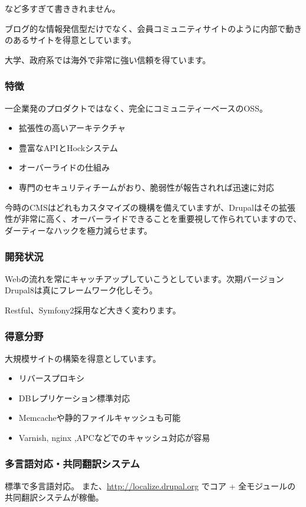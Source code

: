 \documentclass[mingoth,a4paper]{jsarticle}
\begin{document}
など多すぎて書ききれません。

ブログ的な情報発信型だけでなく、会員コミュニティサイトのように内部で動きのあるサイトを得意としています。

大学、政府系では海外で非常に強い信頼を得ています。

\subsubsection{特徴}
一企業発のプロダクトではなく、完全にコミュニティーベースのOSS。

\begin{itemize}
\item 拡張性の高いアーキテクチャ
\item 豊富なAPIとHockシステム
\item オーバーライドの仕組み
\item 専門のセキュリティチームがおり、脆弱性が報告されれば迅速に対応
\end{itemize}

今時のCMSはどれもカスタマイズの機構を備えていますが、Drupalはその拡張性が非常に高く、オーバーライドできることを重要視して作られていますので、ダーティーなハックを極力減らせます。

\subsubsection{開発状況}
Webの流れを常にキャッチアップしていこうとしています。次期バージョンDrupal8は真にフレームワーク化しそう。

Restful、Symfony2採用など大きく変わります。

\subsubsection{得意分野}
大規模サイトの構築を得意としています。
\begin{itemize}
\item リバースプロキシ
\item DBレプリケーション標準対応
\item Memcacheや静的ファイルキャッシュも可能
\item Varnish, nginx ,APCなどでのキャッシュ対応が容易
\end{itemize}

\subsubsection{多言語対応・共同翻訳システム}
標準で多言語対応。
また、\url{http://localize.drupal.org} でコア + 全モジュールの共同翻訳システムが稼働。
\end{document}
